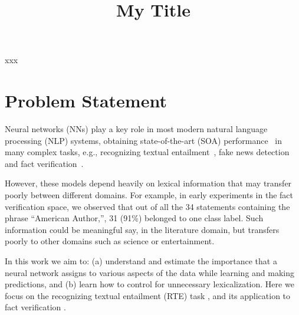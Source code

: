 \documentclass[conference,onecolumn]{IEEEtran}
\begin{document}
\title{My Title}  


\author{\IEEEauthorblockN{}
}



\maketitle


\begin{IEEEkeywords}
xxx
\end{IEEEkeywords}


%



\section*{Problem Statement}
Neural networks (NNs)  play a key role in most modern natural language processing (NLP) systems, obtaining state-of-the-art (SOA) performance~\citep{devlin2018bert, sun2018improving,bohnet2018morphosyntactic} in many complex tasks, e.g., recognizing textual entailment~\citep{kim2018semantic}, fake news detection~\citep{baird2017talos} and fact verification~\citep{nie2018combining}.

However, these models depend heavily on lexical information that may transfer poorly between different domains. For example, in early experiments in the fact verification space, we observed that out of all the 34 statements containing the phrase ``American Author,'', 31 (91\%) belonged to one class label. Such information could be meaningful say, in the literature domain, but transfers poorly to other domains such as science or entertainment. 

In this work we aim to: (a) understand and estimate the importance that a neural network assigns to various aspects of the data while learning and making predictions, and (b) learn how to control for unnecessary lexicalization. Here we focus on the recognizing textual entailment (RTE) task \citep{dagan2013recognizing}, and its application to fact verification \citep{thorne2018fever, pomerleau2017fake}.
\end{document}
